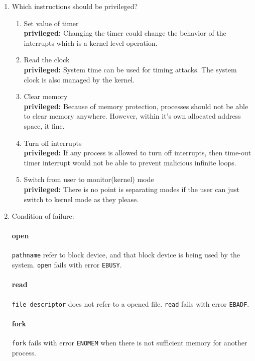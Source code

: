 \documentclass{article}
\begin{document}
\begin{enumerate} [label=\textbf{\arabic*}.]
	\item Which instructions should be privileged?
		\begin{enumerate} [label=\textbf{\alph*})]
			\item Set value of timer \\
				\textbf{privileged:} Changing the timer could change the behavior of
				the interrupts which is a kernel level operation.
			\item Read the clock \\
				\textbf{privileged:} System time can be used for timing attacks. The
				system clock is also managed by the kernel.
			\item Clear memory\\
				\textbf{privileged:} Because of memory protection, processes should not
				be able to clear memory anywhere. However, within it's own allocated
				address space, it fine.
			\item Turn off interrupts\\
				\textbf{privileged:} If any process is allowed to turn off interrupts,
				then time-out timer interrupt would not be able to prevent malicious
				infinite loops.
			\item Switch from user to monitor(kernel) mode\\
				\textbf{privileged:} There is no point is separating modes if the user
				can just switch to kernel mode as they please.
		\end{enumerate}

	\item Condition of failure:\\
		\paragraph{open}\texttt{pathname} refer to block device, and that block
		device is being used by the system. \texttt{open} fails with error
		\texttt{EBUSY}.
		\paragraph{read} \texttt{file descriptor} does not refer to a opened file.
		\texttt{read} fails with error \texttt{EBADF}.
		\paragraph{fork} \texttt{fork} fails with error \texttt{ENOMEM} when there
		is not sufficient memory for another process.

\end{enumerate}
\end{document}
